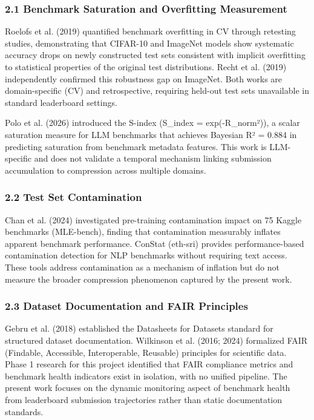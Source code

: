 
\subsubsection{2.1 Benchmark Saturation and Overfitting Measurement}

Roelofs et al. (2019) quantified benchmark overfitting in CV through retesting studies, demonstrating that CIFAR-10 and ImageNet models show systematic accuracy drops on newly constructed test sets consistent with implicit overfitting to statistical properties of the original test distributions. Recht et al. (2019) independently confirmed this robustness gap on ImageNet. Both works are domain-specific (CV) and retrospective, requiring held-out test sets unavailable in standard leaderboard settings.

Polo et al. (2026) introduced the S-index (S_index = exp(-R_norm²)), a scalar saturation measure for LLM benchmarks that achieves Bayesian R² = 0.884 in predicting saturation from benchmark metadata features. This work is LLM-specific and does not validate a temporal mechanism linking submission accumulation to compression across multiple domains.

\subsubsection{2.2 Test Set Contamination}

Chan et al. (2024) investigated pre-training contamination impact on 75 Kaggle benchmarks (MLE-bench), finding that contamination measurably inflates apparent benchmark performance. ConStat (eth-sri) provides performance-based contamination detection for NLP benchmarks without requiring text access. These tools address contamination as a mechanism of inflation but do not measure the broader compression phenomenon captured by the present work.

\subsubsection{2.3 Dataset Documentation and FAIR Principles}

Gebru et al. (2018) established the Datasheets for Datasets standard for structured dataset documentation. Wilkinson et al. (2016; 2024) formalized FAIR (Findable, Accessible, Interoperable, Reusable) principles for scientific data. Phase 1 research for this project identified that FAIR compliance metrics and benchmark health indicators exist in isolation, with no unified pipeline. The present work focuses on the dynamic monitoring aspect of benchmark health from leaderboard submission trajectories rather than static documentation standards.

